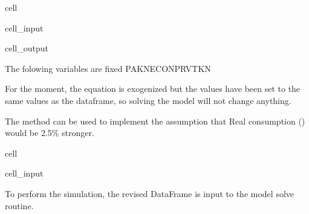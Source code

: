\documentclass[letterpaper,10pt,english]{jupyterBook}
\begin{document}
\begin{sphinxuseclass}{cell}\begin{sphinxVerbatimInput}

\begin{sphinxuseclass}{cell_input}
\begin{sphinxVerbatim}[commandchars=\\\{\}]
 
\end{sphinxVerbatim}

\end{sphinxuseclass}\end{sphinxVerbatimInput}
\begin{sphinxVerbatimOutput}

\begin{sphinxuseclass}{cell_output}
\begin{sphinxVerbatim}[commandchars=\\\{\}]
The folowing variables are fixed
PAKNECONPRVTKN
\end{sphinxVerbatim}

\end{sphinxuseclass}\end{sphinxVerbatimOutput}

\end{sphinxuseclass}
\sphinxAtStartPar
For the moment, the equation is exogenized but the values have been set to the same values as the  dataframe, so solving the model will not change anything.

\sphinxAtStartPar
The  method can be used to implement the assumption that Real consumption () would be 2.5\% stronger.

\begin{sphinxuseclass}{cell}\begin{sphinxVerbatimInput}

\begin{sphinxuseclass}{cell_input}
\begin{sphinxVerbatim}[commandchars=\\\{\}]
\end{sphinxVerbatim}

\end{sphinxuseclass}\end{sphinxVerbatimInput}

\end{sphinxuseclass}
\sphinxAtStartPar
To perform the simulation, the revised  DataFrame is input to the  model solve routine.
\end{document}
